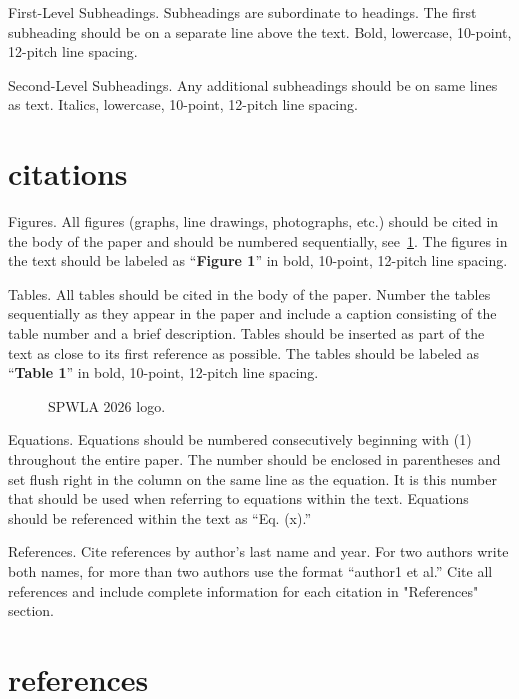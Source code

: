 \documentclass[10pt,twocolumn,twoside]{article}
\begin{document}
First-Level Subheadings. Subheadings are subordinate to headings. The first subheading should be on a separate line above the text. Bold, lowercase, 10-point, 12-pitch line spacing.

Second-Level Subheadings. Any additional subheadings should be on same lines as text. Italics, lowercase, 10-point, 12-pitch line spacing.

\section{citations}

Figures. All figures (graphs, line drawings, photographs, etc.) should be cited in the body of the paper and should be numbered sequentially, see~\cref{fig:logo}. The figures in the text should be labeled as “\textbf{Figure 1}” in bold, 10-point, 12-pitch line spacing.

Tables. All tables should be cited in the body of the paper. Number the tables sequentially as they appear in the paper and include a caption consisting of the table number and a brief description. Tables should be inserted as part of the text as close to its first reference as possible. The tables should be labeled as “\textbf{Table 1}” in bold, 10-point, 12-pitch line spacing.

\begin{figure}
	\centering
	\caption{SPWLA 2026 logo.}
	\label{fig:logo}
\end{figure}


Equations. Equations should be numbered consecutively beginning with (1) throughout the entire paper. The number should be enclosed in parentheses and set flush right in the column on the same line as the equation. It is this number that should be used when referring to equations within the text. Equations should be referenced within the text as “Eq. (x).”

References. Cite references by author’s last name and year. For two authors write both names, for more than two authors use the format “author1 et al.” Cite all references and include complete information for each citation in "References" section.

\section{references}
\end{document}
